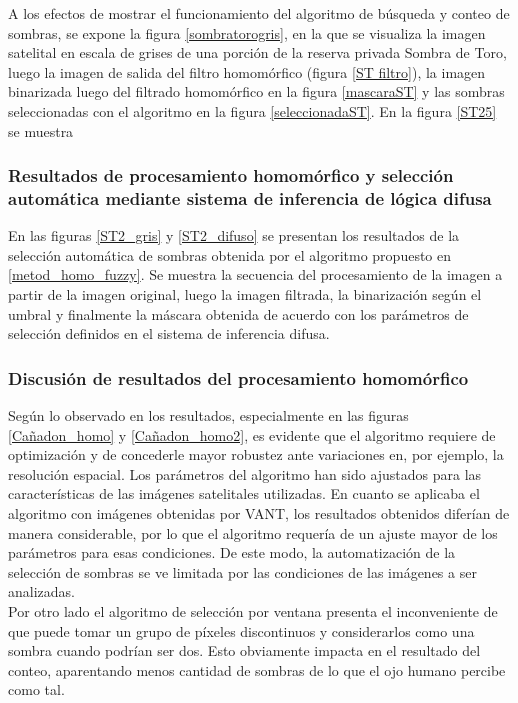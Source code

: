A los efectos de mostrar el funcionamiento del algoritmo de búsqueda y conteo de sombras, se expone la figura \ref{sombratorogris}, en la que se visualiza la imagen satelital en escala de grises de una porción de la reserva privada Sombra de Toro, luego la imagen de salida del filtro homomórfico (figura \ref{ST filtro}), la imagen binarizada luego del filtrado homomórfico en la figura \ref{mascaraST} y las sombras seleccionadas con el algoritmo en la figura \ref{seleccionadaST}. En la figura \ref{ST25} se muestra



\subsubsection{Resultados de procesamiento homomórfico y selección automática mediante sistema de inferencia de lógica difusa} \label{resultados homo difusa}
En las figuras \ref{ST2_gris} y \ref{ST2_difuso} se presentan los resultados de la selección automática de sombras obtenida por el algoritmo propuesto en \ref{metod_homo_fuzzy}.
Se muestra la secuencia del procesamiento de la imagen a partir de la imagen original, luego la imagen filtrada, la binarización según el umbral y finalmente la máscara obtenida de acuerdo con los parámetros de selección definidos en el sistema de inferencia difusa.



\subsubsection{Discusión de resultados del procesamiento homomórfico}

Según lo observado en los resultados, especialmente en las figuras \ref{Cañadon_homo} y \ref{Cañadon_homo2}, es evidente que el algoritmo requiere de optimización y de concederle mayor robustez ante variaciones en, por ejemplo, la resolución espacial. Los parámetros del algoritmo han sido ajustados para las características de las imágenes satelitales utilizadas. En cuanto se aplicaba el algoritmo con imágenes obtenidas por VANT, los resultados obtenidos diferían de manera considerable, por lo que el algoritmo requería de un ajuste mayor de los parámetros para esas condiciones. De este modo, la automatización de la selección de sombras se ve limitada por las condiciones de las imágenes a ser analizadas.\\
Por otro lado el algoritmo de selección por ventana presenta el inconveniente de que puede tomar un grupo de píxeles discontinuos y considerarlos como una sombra cuando podrían ser dos. Esto obviamente impacta en el resultado del conteo, aparentando menos cantidad de sombras de lo que el ojo humano percibe como tal.                                                                                                                              

